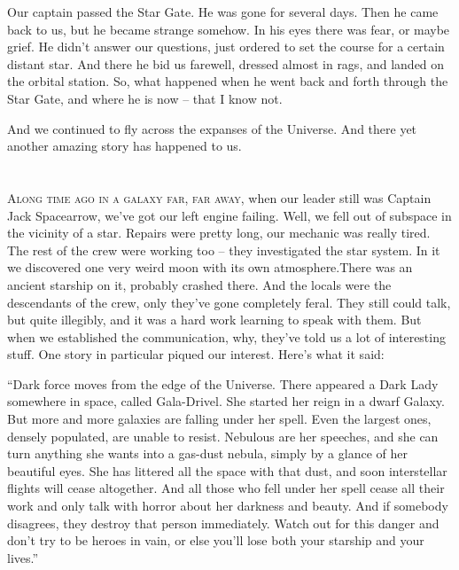 \documentclass[ebook,twoside,final,openright]{memoir}
\begin{document}
Our captain passed the Star Gate. He was gone for several days. Then he came back to us, but he became strange somehow. In his eyes there was fear, or maybe grief. He didn’t answer our questions, just ordered to set the course for a certain distant star. And there he bid us farewell, dressed almost in rags, and landed on the orbital station. So, what happened when he went back and forth through the Star Gate, and where he is now – that I know not. \par
\par
 And we continued to fly across the expanses of the Universe. And there yet another amazing story has happened to us.
\chapter{}
\par
\lettrine{A}{long time ago in a galaxy far, far away,} when our leader still was Captain Jack Spacearrow, we’ve got our left engine failing. Well, we fell out of subspace in the vicinity of a star. Repairs were pretty long, our mechanic was really tired. The rest of the crew were working too – they investigated the star system. In it we discovered one very weird moon with its own atmosphere.There was an ancient starship on it, probably crashed there. And the locals were the descendants of the crew, only they’ve gone completely feral. They still could talk, but quite illegibly, and it was a hard work learning to speak with them. But when we established the communication, why, they’ve told us a lot of interesting stuff. One story in particular piqued our interest. Here’s what it said:\par
\par
“Dark force moves from the edge of the Universe. There appeared a Dark Lady somewhere in space, called Gala-Drivel. She started her reign in a dwarf Galaxy. But more and more galaxies are falling under her spell. Even the largest ones, densely populated, are unable to resist. Nebulous are her speeches, and she can turn anything she wants into a gas-dust nebula, simply by a glance of her beautiful eyes. She has littered all the space with that dust, and soon interstellar flights will cease altogether. And all those who fell under her spell cease all their work and only talk with horror about her darkness and beauty. And if somebody disagrees, they destroy that person immediately. Watch out for this danger and don’t try to be heroes in vain, or else you’ll lose both your starship and your lives.”\par
\end{document}
